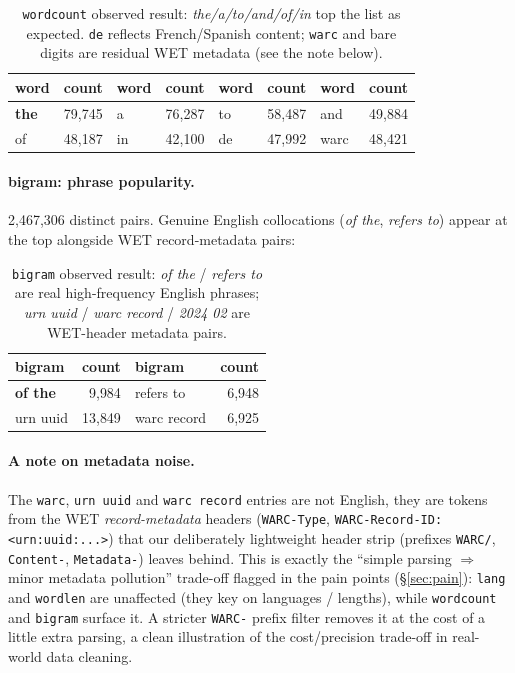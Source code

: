 \documentclass[11pt,a4paper]{article}
\newcommand{\code}[1]{\texttt{\small #1}}
\begin{document}
\begin{table}[H]
\centering
\small
\renewcommand{\arraystretch}{1.1}
\begin{tabular}{@{}lrlrlrlr@{}}
\toprule
word & count & word & count & word & count & word & count\\
\midrule
\textbf{the} & 79{,}745 & a  & 76{,}287 & to & 58{,}487 & and & 49{,}884\\
of  & 48{,}187 & in & 42{,}100 & de & 47{,}992 & warc & 48{,}421\\
\bottomrule
\end{tabular}
\caption{\code{wordcount} observed result: \emph{the/a/to/and/of/in} top the
list as expected. \code{de} reflects French/Spanish content; \code{warc} and
bare digits are residual WET metadata (see the note below).}
\end{table}

\paragraph{bigram: phrase popularity.} 2{,}467{,}306 distinct pairs. Genuine
English collocations (\emph{of the}, \emph{refers to}) appear at the top
alongside WET record-metadata pairs:

\begin{table}[H]
\centering
\small
\renewcommand{\arraystretch}{1.1}
\begin{tabular}{@{}lrlr@{}}
\toprule
bigram & count & bigram & count\\
\midrule
\textbf{of the} & 9{,}984 & refers to & 6{,}948\\
urn uuid & 13{,}849 & warc record & \phantom{0}6{,}925\\
\bottomrule
\end{tabular}
\caption{\code{bigram} observed result: \emph{of the} / \emph{refers to} are
real high-frequency English phrases; \emph{urn uuid} / \emph{warc record} /
\emph{2024 02} are WET-header metadata pairs.}
\end{table}

\paragraph{A note on metadata noise.} The \code{warc}, \code{urn uuid} and
\code{warc record} entries are not English, they are tokens from the WET
\emph{record-metadata} headers (\code{WARC-Type}, \code{WARC-Record-ID:
<urn:uuid:...>}) that our deliberately lightweight header strip
(prefixes \code{WARC/}, \code{Content-}, \code{Metadata-}) leaves behind. This
is exactly the ``simple parsing $\Rightarrow$ minor metadata pollution''
trade-off flagged in the pain points (\S\ref{sec:pain}): \code{lang} and
\code{wordlen} are unaffected (they key on languages / lengths), while
\code{wordcount} and \code{bigram} surface it. A stricter \code{WARC-} prefix
filter removes it at the cost of a little extra parsing, a clean illustration of
the cost/precision trade-off in real-world data cleaning.
\end{document}
